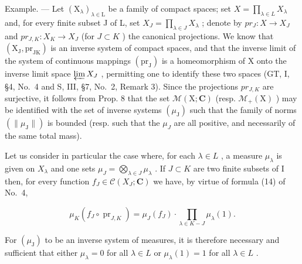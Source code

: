 Example. --- Let \((\mathrm{X}_{\lambda})_{\lambda\in\mathrm{L}}\) be a family of compact spaces; set \(X=\prod_{\lambda\in L}X_{\lambda}\) and, for every finite subset J of L, set \(X_{J}=\prod_{\lambda\in J}X_{\lambda}\) ; denote by \(pr_{J}:X\to X_{J}\) and \(pr_{J,K}:X_{K}\to X_{J}\) (for \(J\subset K\) ) the canonical projections. We know that \((\mathrm{X}_{\mathrm{J}},\mathrm{pr}_{\mathrm{JK}})\) is an inverse system of compact spaces, and that the inverse limit of the system of continuous mappings \((\mathrm{pr}_{\mathrm{J}})\) is a homeomorphism of X onto the inverse limit space \(\varprojlim X_{J}\) , permitting one to identify these two spaces (GT, I, §4, No.~4 and S, III, §7, No.~2, Remark 3). Since the projections \(pr_{J,K}\) are surjective, it follows from Prop. 8 that the set \(\mathcal{M}(\mathrm{X};\mathbf{C})\) (resp. \(\mathcal{M}_{+}(\mathrm{X})\) ) may be identified with the set of inverse systems \((\mu_{\mathrm{J}})\) such that the family of norms \((\|\mu_{\mathrm{J}}\|)\) is bounded (resp. such that the \(\mu_{J}\) are all positive, and necessarily of the same total mass).

Let us consider in particular the case where, for each \(\lambda \in L\) , a measure \(\mu_{\lambda}\) is given on \(X_{\lambda}\) and one sets \(\mu_{J} = \bigotimes_{\lambda \in J} \mu_{\lambda}\) . If \(J \subset K\) are two finite subsets of I then, for every function \(f_{J} \in \mathcal{C}(X_{J}; \mathbf{C})\) we have, by virtue of formula (14) of No.~4,

\[
\mu_ {K} \left(f _ {J} \circ \operatorname{pr} _ {J, K}\right) = \mu_ {J} \left(f _ {J}\right) \cdot \prod_ {\lambda \in K - J} \mu_ {\lambda} (1).\tag{17}
\]

For \((\mu_{\mathrm{J}})\) to be an inverse system of measures, it is therefore necessary and sufficient that either \(\mu_{\lambda}=0\) for all \(\lambda\in L\) or \(\mu_{\lambda}(1)=1\) for all \(\lambda\in L\) .

